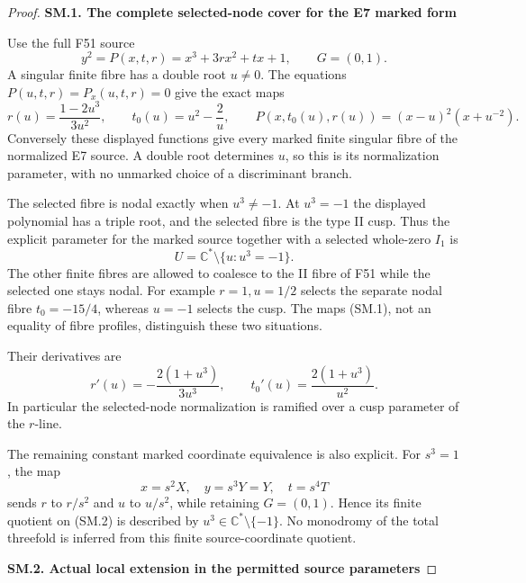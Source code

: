 \begin{proof}
\par

\medskip\noindent\textbf{SM.1. The complete selected-node cover for the E7 marked form}

\par\nobreak

Use the full F51 source
\[
 y^2=P(x,t,r)=x^3+3rx^2+tx+1,\qquad G=(0,1).
\]
A singular finite fibre has a double root \(u\ne0\). The equations
\(P(u,t,r)=P_x(u,t,r)=0\) give the exact maps
\[
 r(u)=\frac{1-2u^3}{3u^2},\qquad
 t_0(u)=u^2-\frac2u,\qquad
 P(x,t_0(u),r(u))=(x-u)^2(x+u^{-2}).
 \tag{SM.1}
\]
Conversely these displayed functions give every marked finite
singular fibre of the normalized E7 source. A double root
determines \(u\), so this is its normalization parameter, with
no unmarked choice of a discriminant branch.

The selected fibre is nodal exactly when \(u^3\ne-1\). At
\(u^3=-1\) the displayed polynomial has a triple root, and
the selected fibre is the type II cusp. Thus the explicit
parameter for the marked source together with a selected
whole-zero \(I_1\) is
\[
                         U=\mathbb C^*\setminus\{u:u^3=-1\}.
 \tag{SM.2}
\]
The other finite fibres are allowed to coalesce to the II
fibre of F51 while the selected one stays nodal.
For example \(r=1,u=1/2\) selects the separate nodal
fibre \(t_0=-15/4\), whereas \(u=-1\) selects the cusp.
The maps (SM.1), not an equality of fibre profiles, distinguish
these two situations.

Their derivatives are
\[
 r'(u)=-\frac{2(1+u^3)}{3u^3},\qquad
 t_0'(u)=\frac{2(1+u^3)}{u^2}.
 \tag{SM.3}
\]
In particular the selected-node normalization is ramified
over a cusp parameter of the \(r\)-line.

The remaining constant marked coordinate equivalence is also
explicit. For \(s^3=1\), the map
\[
 x=s^2X,\quad y=s^3Y=Y,\quad t=s^4T
\]
sends \(r\) to \(r/s^2\) and \(u\) to \(u/s^2\), while
retaining \(G=(0,1)\). Hence its finite quotient on (SM.2)
is described by \(u^3\in\mathbb C^*\setminus\{-1\}\).
No monodromy of the total threefold is inferred from this
finite source-coordinate quotient.

\par

\medskip\noindent\textbf{SM.2. Actual local extension in the permitted source parameters}

\par\nobreak


\end{proof}
